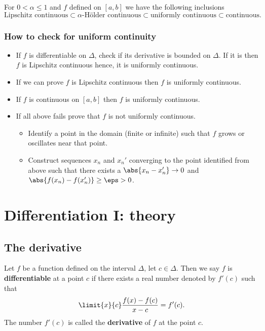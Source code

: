 \documentclass[12pt, a4paper]{article}
\begin{document}
\begin{mdremark}
    For \(0 < \alpha \leq 1\) and \(f\) defined on \([a,b]\) we have the following inclusions
    \[\text{Lipschitz continuous} \subset \alpha\text{-Hölder continuous} \subset \text{uniformly continuous} \subset \text{continuous}.\]
\end{mdremark}

\subsubsection{How to check for uniform continuity}

\begin{itemize}
    \item If \(f\) is differentiable on \(\Delta\), check if its derivative is bounded on \(\Delta\). If it is then \(f\) is Lipschitz continuous hence, it is uniformly continuous.
    \item If we can prove \(f\) is Lipschitz continuous then \(f\) is uniformly continuous.
    \item If \(f\) is continuous on \([a,b]\) then \(f\) is uniformly continuous.
    \item If all above fails prove that \(f\) is not uniformly continuous. 
    \begin{itemize}
        \item Identify a point in the domain (finite or infinite) such that \(f\) grows or oscillates near that point.
        \item Construct sequences \(x_n\) and \(x_n'\) converging to the point identified from above such that there exists a \(\abs{x_n-x_n'} \to 0\) and \(\abs{f(x_n)-f(x_n')} \geq \eps>0\).
    \end{itemize} 
\end{itemize}

\section{Differentiation I: theory}

\subsection{The derivative}

\begin{definition}\label{def:differentiable}
    Let \(f\) be a function defined on the interval \(\Delta\), let \(c \in \Delta\). Then we say \(f\) is \textbf{differentiable} at a point \(c\) if there exists a real number denoted by \(f'(c)\) such that 
    \[\limit{x}{c} \frac{f(x)-f(c)}{x-c} = f'(c).\]
    The number \(f'(c)\) is called the \textbf{derivative} of \(f\) at the point \(c\).
\end{definition}
\end{document}
